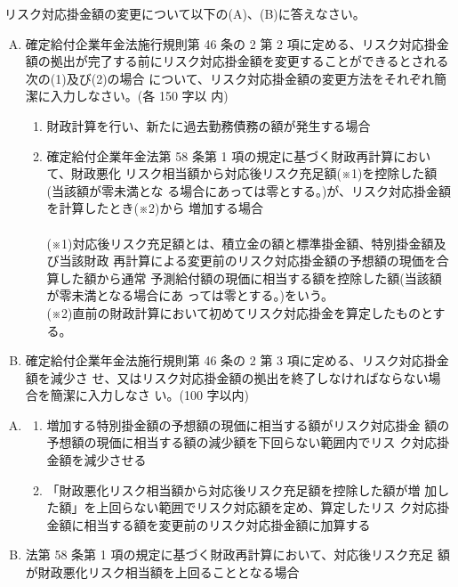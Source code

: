 \begin{shortanswer}[年金2 2025 問題2(1)]
  リスク対応掛金額の変更について以下の(A)、(B)に答えなさい。
\\
  \begin{enumerate}[(A)]
    \item 確定給付企業年金法施行規則第 46 条の 2 第 2 項に定める、リスク対応掛金額の拠出が完了する前にリスク対応掛金額を変更することができるとされる次の(1)及び(2)の場合 について、リスク対応掛金額の変更方法をそれぞれ簡潔に入力しなさい。(各 150 字以 内)
    \\
    \begin{enumerate}[(1)]
      \item 財政計算を行い、新たに過去勤務債務の額が発生する場合\\
      \item 確定給付企業年金法第 58 条第 1 項の規定に基づく財政再計算において、財政悪化 リスク相当額から対応後リスク充足額(※1)を控除した額(当該額が零未満とな る場合にあっては零とする。)が、リスク対応掛金額を計算したとき(※2)から 増加する場合\\
      \\
      (※1)対応後リスク充足額とは、積立金の額と標準掛金額、特別掛金額及び当該財政 再計算による変更前のリスク対応掛金額の予想額の現価を合算した額から通常 予測給付額の現価に相当する額を控除した額(当該額が零未満となる場合にあ っては零とする。)をいう。\\
      (※2)直前の財政計算において初めてリスク対応掛金を算定したものとする。\\
    \end{enumerate}
    \item 確定給付企業年金法施行規則第 46 条の 2 第 3 項に定める、リスク対応掛金額を減少さ せ、又はリスク対応掛金額の拠出を終了しなければならない場合を簡潔に入力しなさ い。(100 字以内)
  \end{enumerate}
\end{shortanswer}

\begin{answerbox}
  \begin{enumerate}[(A)]
    \item \begin{enumerate}[(1)]
      \item 増加する特別掛金額の予想額の現価に相当する額がリスク対応掛金
額の予想額の現価に相当する額の減少額を下回らない範囲内でリス
ク対応掛金額を減少させる\\
      \item 「財政悪化リスク相当額から対応後リスク充足額を控除した額が増
加した額」を上回らない範囲でリスク対応額を定め、算定したリス
ク対応掛金額に相当する額を変更前のリスク対応掛金額に加算する\\
    \end{enumerate}
    \item 法第 58 条第 1 項の規定に基づく財政再計算において、対応後リスク充足 額が財政悪化リスク相当額を上回ることとなる場合
  \end{enumerate}
\end{answerbox}

